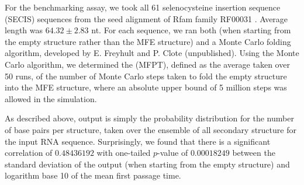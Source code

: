 For the benchmarking assay, we took all 61 selenocysteine insertion sequence
(SECIS) sequences from the seed alignment of Rfam family RF00031
\cite{Gardner.nar11}. Average length was $64.32 \pm 2.83$ nt.
For each sequence, we ran both \fftbor (when starting
from the empty structure rather than the MFE structure) and a Monte Carlo
folding algorithm, developed by E. Freyhult and P. Clote (unpublished).
Using the Monte Carlo algorithm, we
determined the \mfpt (MFPT), defined as the average
taken over 50 runs, of the number of Monte Carlo steps taken to fold
the empty structure into the MFE structure, where an absolute upper bound
of 5 million steps was allowed in the simulation.

As described above, \fftbor output is simply
the probability distribution
for the number of base pairs per structure, taken over the ensemble
of all secondary structure for the input RNA
sequence. Surprisingly, we found that there is a significant
correlation of  $0.48436192$ with one-tailed
$p$-value of $0.00018249$ between the
standard deviation of the \fftbor output (when starting from the
empty structure) and logarithm base 10 of the mean first passage time.

